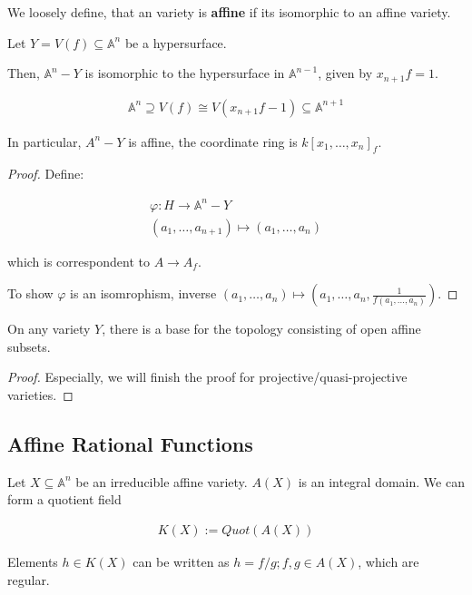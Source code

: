\documentclass[Total.tex]{subfiles}
\begin{document}
		\begin{Def}
			We loosely define, that an variety is \textbf{affine} if its isomorphic to an affine variety.
		\end{Def}
		
		\begin{lemma}
			Let $Y=V(f)\subseteq \mathbb{A}^n$ be a hypersurface.
			
			Then, $\mathbb{A}^n-Y$ is isomorphic to the hypersurface in $\mathbb{A}^{n-1}$, given by $x_{n+1}f=1$.
			
			\begin{gather*}
				\mathbb{A}^n\supseteq V(f)\cong V(x_{n+1}f-1)\subseteq \mathbb{A}^{n+1}
			\end{gather*}
			
			In particular, $A^n-Y$ is affine, the coordinate ring is $k[x_1,\dots,x_n]_f$. 
		\end{lemma}
		
		\begin{proof}
			Define:
			
			\begin{gather*}
				\varphi:H\rightarrow \mathbb{A}^n-Y\\
				(a_1,\dots,a_{n+1})\mapsto (a_1,\dots,a_n)
			\end{gather*}
			
			which is correspondent to $A\rightarrow A_f$. 
			
			To show $\varphi$ is an isomrophism, inverse $(a_1,\dots,a_n)\mapsto (a_1,\dots,a_n,\frac{1}{f(a_1,\dots,a_n)})$.
		\end{proof}
		
		\begin{corollary}
			On any variety $Y$, there is a base for the topology consisting of open affine subsets.
		\end{corollary}
		
		\begin{proof}
			Especially, we will finish the proof for projective/quasi-projective varieties. 
		\end{proof}
		
		\subsection{Affine Rational Functions}
		
		
		\begin{Def}
			Let $X\subseteq \mathbb{A}^n$ be an irreducible affine variety. $A(X)$ is an integral domain. We can form a quotient field
			
			\begin{gather*}
				K(X):=Quot(A(X))
			\end{gather*}
			
			Elements $h\in K(X)$ can be written as $h=f/g;f,g\in A(X)$, which are regular.
		\end{Def}
		
\end{document}
